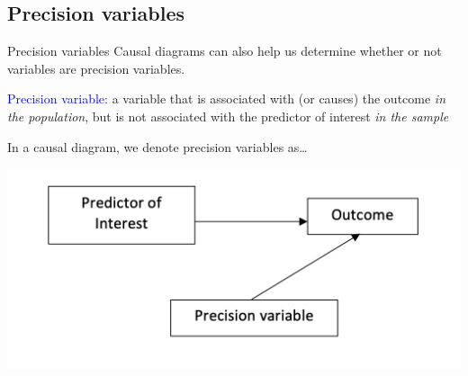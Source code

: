 \documentclass[10pt,t]{beamer}
\begin{document}
\subsection{Precision variables}

\begin{frame}{Precision variables}
Causal diagrams can also help us determine whether or not variables are precision variables.

\vspace{0.3cm}

\textcolor{blue}{Precision variable}: a variable that is associated with (or causes) the outcome \textit{in the population}, but is not associated with the predictor of interest \textit{in the sample} \pause

\vspace{0.3cm}

In a causal diagram, we denote precision variables as\dots

\vspace{0.3cm}

\centering \includegraphics[scale=0.4]{precvar1.png}

\end{frame}
\end{document}

